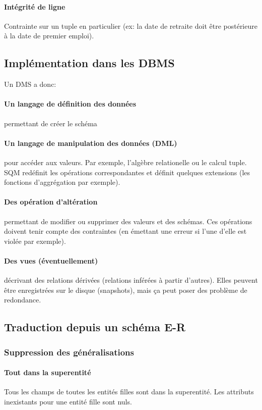 \documentclass[a4paper]{article}
\begin{document}
\paragraph{Intégrité de ligne}
Contrainte sur un tuple en particulier (ex: la date de retraite doit être postérieure
à la date de premier emploi).

\subsection{Implémentation dans les DBMS}
Un DMS a donc:
\paragraph{Un langage de définition des données} permettant de créer le schéma
\paragraph{Un langage de manipulation des données (DML)} pour accéder aux valeurs.
Par exemple, l'algèbre relationelle ou le calcul tuple. SQM redéfinit les opérations
correspondantes et définit quelques extensions (les fonctions d'aggrégation par exemple).
\paragraph{Des opération d'altération} permettant de modifier ou supprimer des valeurs et des schémas.
Ces opérations doivent tenir compte des contraintes (en émettant une erreur si l'une d'elle est violée par exemple).
\paragraph{Des vues (éventuellement)} décrivant des relations dérivées
(relations inférées à partir d'autres). Elles peuvent être enregistrées sur le
disque (snapshots), mais ça peut poser des problème de redondance.

\subsection{Traduction depuis un schéma E-R}
\subsubsection{Suppression des généralisations}
\paragraph{Tout dans la superentité}
Tous les champs de toutes les entités filles sont dans la superentité. Les attributs
inexistants pour une entité fille sont nuls.
\end{document}
